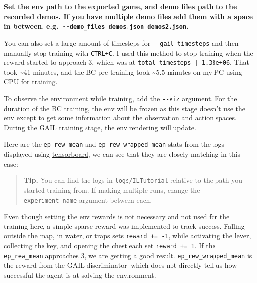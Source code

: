 \documentclass[11pt,a4paper]{article}
\begin{document}
\textbf{Set the env path to the exported game, and demo files path to the recorded demos. If you have multiple demo files add them with a space in between, e.g.~\passthrough{\lstinline!--demo_files demos.json demos2.json!}.}

You can also set a large amount of timesteps for \passthrough{\lstinline!--gail_timesteps!} and then manually stop training with \passthrough{\lstinline!CTRL+C!}. I used this method to stop training when the reward started to approach 3, which was at \passthrough{\lstinline!total_timesteps | 1.38e+06!}. That took \textasciitilde41 minutes, and the BC pre-training took \textasciitilde5.5 minutes on my PC using CPU for training.

To observe the environment while training, add the \passthrough{\lstinline!--viz!} argument. For the duration of the BC training, the env will be frozen as this stage doesn't use the env except to get some information about the observation and action spaces. During the GAIL training stage, the env rendering will update.

Here are the \passthrough{\lstinline!ep_rew_mean!} and \passthrough{\lstinline!ep_rew_wrapped_mean!} stats from the logs displayed using \href{https://github.com/edbeeching/godot_rl_agents/blob/main/docs/TRAINING_STATISTICS.md}{tensorboard}, we can see that they are closely matching in this case:


\begin{quote}
\textbf{Tip.} You can find the logs in \passthrough{\lstinline!logs/ILTutorial!} relative to the path you started training from. If making multiple runs, change the \passthrough{\lstinline!--experiment_name!} argument between each.
\end{quote}

Even though setting the env rewards is not necessary and not used for the training here, a simple sparse reward was implemented to track success. Falling outside the map, in water, or traps sets \passthrough{\lstinline!reward += -1!}, while activating the lever, collecting the key, and opening the chest each set \passthrough{\lstinline!reward += 1!}. If the \passthrough{\lstinline!ep_rew_mean!} approaches 3, we are getting a good result. \passthrough{\lstinline!ep_rew_wrapped_mean!} is the reward from the GAIL discriminator, which does not directly tell us how successful the agent is at solving the environment.
\end{document}
